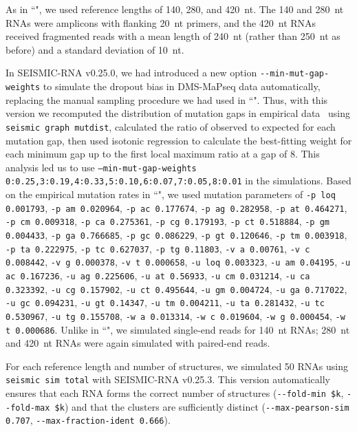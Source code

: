 \documentclass[unnumsec,webpdf,contemporary,large]{oup-authoring-template}%
\theoremstyle{thmstyleone}%
\theoremstyle{thmstyletwo}%
\theoremstyle{thmstylethree}%
\begin{document}
As in ``", we used reference lengths of 140, 280, and 420~nt.
The 140 and 280~nt RNAs were amplicons with flanking 20~nt primers, and the 420~nt RNAs received fragmented reads with a mean length of 240~nt (rather than 250~nt as before) and a standard deviation of 10~nt.

In SEISMIC-RNA v0.25.0, we had introduced a new option \verb|--min-mut-gap-weights| to simulate the dropout bias in DMS-MaPseq data automatically, replacing the manual sampling procedure we had used in ``".
Thus, with this version we recomputed the distribution of mutation gaps in empirical data~\cite{Morandi2021} using \verb|seismic graph mutdist|, calculated the ratio of observed to expected for each mutation gap, then used isotonic regression to calculate the best-fitting weight for each minimum gap up to the first local maximum ratio at a gap of 8.
This analysis led us to use \texttt{--min-mut-gap-weights 0:0.25,3:0.19,4:0.33,5:0.10,6:0.07,7:0.05,8:0.01} in the simulations.
Based on the empirical mutation rates in ``", we used mutation parameters of \verb|-p loq 0.001793|, \verb|-p am 0.020964|, \verb|-p ac 0.177674|, \verb|-p ag 0.282958|, \verb|-p at 0.464271|, \verb|-p cm 0.009318|, \verb|-p ca 0.275361|, \verb|-p cg 0.179193|, \verb|-p ct 0.518884|, \verb|-p gm 0.004433|, \verb|-p ga 0.766685|, \verb|-p gc 0.086229|, \verb|-p gt 0.120646|, \verb|-p tm 0.003918|, \verb|-p ta 0.222975|, \verb|-p tc 0.627037|, \verb|-p tg 0.11803|, \verb|-v a 0.00761|, \verb|-v c 0.008442|, \verb|-v g 0.000378|, \verb|-v t 0.000658|, \verb|-u loq 0.003323|, \verb|-u am 0.04195|, \verb|-u ac 0.167236|, \verb|-u ag 0.225606|, \verb|-u at 0.56933|, \verb|-u cm 0.031214|, \verb|-u ca 0.323392|, \verb|-u cg 0.157902|, \verb|-u ct 0.495644|, \verb|-u gm 0.004724|, \verb|-u ga 0.717022|, \verb|-u gc 0.094231|, \verb|-u gt 0.14347|, \verb|-u tm 0.004211|, \verb|-u ta 0.281432|, \verb|-u tc 0.530967|, \verb|-u tg 0.155708|, \verb|-w a 0.013314|, \verb|-w c 0.019604|, \verb|-w g 0.000454|, \verb|-w t 0.000686|.
Unlike in ``", we simulated single-end reads for 140~nt RNAs; 280~nt and 420~nt RNAs were again simulated with paired-end reads.

For each reference length and number of structures, we simulated 50 RNAs using \verb|seismic sim total| with SEISMIC-RNA v0.25.3.
This version automatically ensures that each RNA forms the correct number of structures (\verb|--fold-min $k|, \verb|--fold-max $k|) and that the clusters are sufficiently distinct (\verb|--max-pearson-sim 0.707|, \verb|--max-fraction-ident 0.666|).
\end{document}
